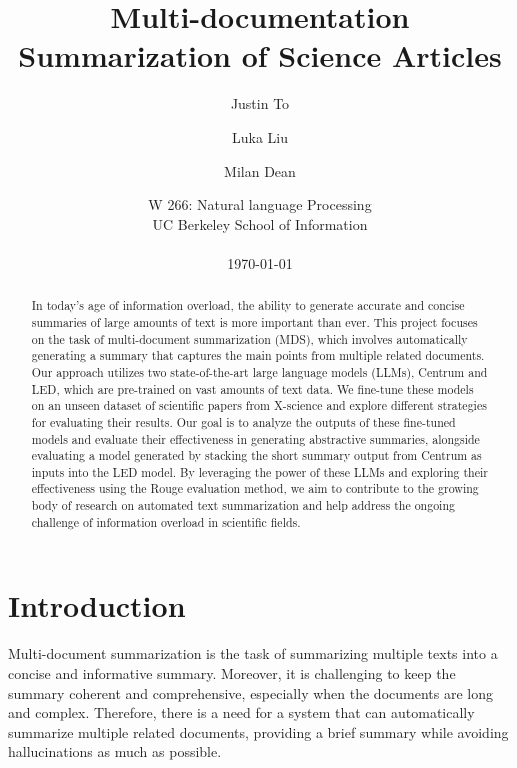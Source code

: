 \documentclass[12pt, twocolumn]{article}
\numberwithin{equation}{section}
\begin{document}
\sloppy %

\title{Multi-documentation Summarization of Science Articles}
\author[1]{Justin To}
\author[1]{Luka Liu}
\author[1]{Milan Dean}
\date{
    W 266: Natural language Processing
    \\UC Berkeley School of Information
    \\~
    \\\today
}
\maketitle

\begin{abstract}%

In today's age of information overload, the ability to generate accurate and concise summaries of large amounts of text is more important than ever. This project focuses on the task of multi-document summarization (MDS), which involves automatically generating a summary that captures the main points from multiple related documents. Our approach utilizes two state-of-the-art large language models (LLMs), Centrum and LED, which are pre-trained on vast amounts of text data. We fine-tune these models on an unseen dataset of scientific papers from X-science and explore different strategies for evaluating their results. Our goal is to analyze the outputs of these fine-tuned models and evaluate their effectiveness in generating abstractive summaries, alongside evaluating a model generated by stacking the short summary output from Centrum as inputs into the LED model. By leveraging the power of these LLMs and exploring their effectiveness using the Rouge evaluation method, we aim to contribute to the growing body of research on automated text summarization and help address the ongoing challenge of information overload in scientific fields.

\end{abstract}

\section{Introduction}

Multi-document summarization is the task of summarizing multiple texts into a concise and informative summary. Moreover, it is challenging to keep the summary coherent and comprehensive, especially when the documents are long and complex. Therefore, there is a need for a system that can automatically summarize multiple related documents, providing a brief summary while avoiding hallucinations as much as possible.
\end{document}
